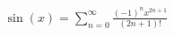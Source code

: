 \documentclass[preview]{standalone}
\begin{document}
\begin{align*}
\sin(x) = \sum_{n=0}^{\infty} \frac{(-1)^n x^{2n+1}}{(2n+1)!}
\end{align*}
\end{document}
